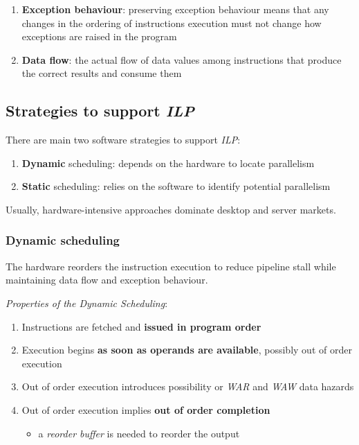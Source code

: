 \documentclass[english]{article}
\begin{document}
\begin{enumerate}
  \item \textbf{Exception behaviour}: preserving exception behaviour means that any changes in the ordering of instructions execution must not change how exceptions are raised in the program
  \item \textbf{Data flow}: the actual flow of data values among instructions that produce the correct results and consume them
\end{enumerate}

\subsection{Strategies to support \textit{ILP}}
\label{sec:strategies-to-support-ilp}

There are main two software strategies to support \textit{ILP}:

\begin{enumerate}
  \item \textbf{Dynamic} scheduling: depends on the hardware to locate parallelism
  \item \textbf{Static} scheduling: relies on the software to identify potential parallelism
\end{enumerate}

Usually, hardware-intensive approaches dominate desktop and server markets.

\subsubsection{Dynamic scheduling}

The hardware reorders the instruction execution to reduce pipeline stall while maintaining data flow and exception behaviour.

\bigskip
\textit{Properties of the Dynamic Scheduling}:

\begin{enumerate}
  \item Instructions are fetched and \textbf{issued in program order}
  \item Execution begins \textbf{as soon as operands are available}, possibly out of order execution
  \item Out of order execution introduces possibility or \textit{WAR} and \textit{WAW} data hazards
  \item Out of order execution implies \textbf{out of order completion}
        \begin{itemize}
          \item a \textit{reorder buffer} is needed to reorder the output
        \end{itemize}
\end{enumerate}
\end{document}
